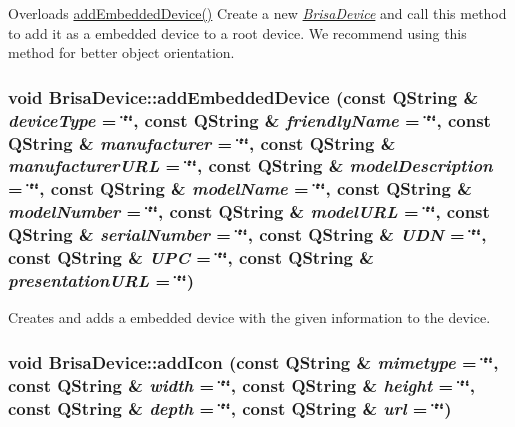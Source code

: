 Overloads \hyperlink{classBrisaUpnp_1_1BrisaDevice_a5b549e316a783368e9bf0e0ffd09a5e4}{addEmbeddedDevice()} Create a new {\itshape \hyperlink{classBrisaUpnp_1_1BrisaDevice}{BrisaDevice}\/} and call this method to add it as a embedded device to a root device. We recommend using this method for better object orientation. \hypertarget{classBrisaUpnp_1_1BrisaDevice_a5b549e316a783368e9bf0e0ffd09a5e4}{
\subsubsection[{addEmbeddedDevice}]{\setlength{\rightskip}{0pt plus 5cm}void BrisaDevice::addEmbeddedDevice (const QString \& {\em deviceType} = {\ttfamily \char`\"{}\char`\"{}}, \/  const QString \& {\em friendlyName} = {\ttfamily \char`\"{}\char`\"{}}, \/  const QString \& {\em manufacturer} = {\ttfamily \char`\"{}\char`\"{}}, \/  const QString \& {\em manufacturerURL} = {\ttfamily \char`\"{}\char`\"{}}, \/  const QString \& {\em modelDescription} = {\ttfamily \char`\"{}\char`\"{}}, \/  const QString \& {\em modelName} = {\ttfamily \char`\"{}\char`\"{}}, \/  const QString \& {\em modelNumber} = {\ttfamily \char`\"{}\char`\"{}}, \/  const QString \& {\em modelURL} = {\ttfamily \char`\"{}\char`\"{}}, \/  const QString \& {\em serialNumber} = {\ttfamily \char`\"{}\char`\"{}}, \/  const QString \& {\em UDN} = {\ttfamily \char`\"{}\char`\"{}}, \/  const QString \& {\em UPC} = {\ttfamily \char`\"{}\char`\"{}}, \/  const QString \& {\em presentationURL} = {\ttfamily \char`\"{}\char`\"{}})}}
\label{classBrisaUpnp_1_1BrisaDevice_a5b549e316a783368e9bf0e0ffd09a5e4}


Creates and adds a embedded device with the given information to the device. \hypertarget{classBrisaUpnp_1_1BrisaDevice_af6a967427b45359a01efd6444f56f54f}{
\subsubsection[{addIcon}]{\setlength{\rightskip}{0pt plus 5cm}void BrisaDevice::addIcon (const QString \& {\em mimetype} = {\ttfamily \char`\"{}\char`\"{}}, \/  const QString \& {\em width} = {\ttfamily \char`\"{}\char`\"{}}, \/  const QString \& {\em height} = {\ttfamily \char`\"{}\char`\"{}}, \/  const QString \& {\em depth} = {\ttfamily \char`\"{}\char`\"{}}, \/  const QString \& {\em url} = {\ttfamily \char`\"{}\char`\"{}})}}
\label{classBrisaUpnp_1_1BrisaDevice_af6a967427b45359a01efd6444f56f54f}


